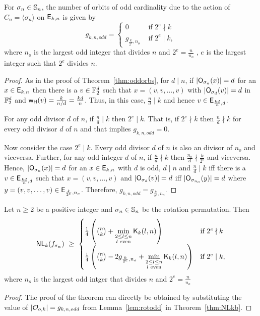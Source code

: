 \documentclass{llncs}
\begin{document}
\begin{lemma}\label{lem:rotodd}
For $\sigma_n \in \mathbb{S}_n$, the number of orbits of odd cardinality due to the action of $C_n = \langle\sigma_n\rangle$ on $\mathsf{E}_{k,n}$ is given by
$$g_{k,n,odd} = \begin{cases}
0 & \text{ if } 2^e \nmid k \\
g_{\frac{k}{2^e},n_o} & \text{ if } 2^e \mid k,
\end{cases}$$
where $n_o$ is the largest odd integer that divides $n$ and $2^e = \frac{n}{n_o}$ \ie, $e$ is the largest integer such that $2^e$ divides $n$.
\end{lemma}

\begin{proof}
As in the proof of Theorem~\ref{thm:oddorbs}, for $d \mid n$, if $|\mathsf{O}_{\sigma_n}(x)| = d$ for an $x \in \mathsf{E}_{k,n}$ then there is a $v \in \mathbb{F}_2^d$ such that $x = (v,v, \ldots, v)$ with $|\mathsf{O}_{\sigma_d}(v)| = d$ in $\mathbb{F}_2^d$ and $\mathsf{w_H}(v) = \frac{k}{n/d} = \frac{kd}{n}$. Thus, in this case, $\frac{n}{d} \mid k$ and hence $v \in \mathsf{E}_{\frac{kd}{n},d}$. 

For any odd divisor $d$ of $n$, if $\frac{n}{d} \mid k$ then $2^e \mid k$. That is, if $2^e \nmid k$ then $\frac{n}{d} \nmid k$ for every odd divisor $d$ of $n$ and that implies $g_{k,n,odd} = 0$.

Now consider the case $2^e \mid k$. Every odd divisor $d$ of $n$ is also an divisor of $n_o$ and viceversa. Further, for any odd integer $d$ of $n$, if $\frac{n}{d} \nmid k$ then $\frac{n_o}{d} \nmid \frac{k}{2^e}$ and viceversa.
Hence, $|\mathsf{O}_{\sigma_n}(x)| = d$ for an $x\in \mathsf{E}_{k,n}$ with $d$ is odd, $d\mid n$ and  $\frac{n}{d} \mid k$ iff there is a $v \in \mathsf{E}_{\frac{kd}{n},d}$ such that $x = (v,v, \ldots, v)$ and $|\mathsf{O}_{\sigma_d}(v)| = d$ iff $|\mathsf{O}_{\sigma_{n_o}}(y)| = d$ where $y = (v,v, \ldots, v) \in \mathsf{E}_{\frac{k}{2^e},n_o}$. Therefore, $g_{k,n,odd} = g_{\frac{k}{2^e},n_o}$.
\end{proof}

\begin{theorem}\label{thm:NLkb_sigma}
Let $n \geq 2$ be a positive integer and $\sigma_n \in \mathbb{S}_n$ be the rotation permutation.
Then $$\mathsf{NL}_{k}(f_{\sigma_n}) ~\geq ~
\begin{cases}
\frac{1}{4}\left({n \choose k} + \min\limits_{\substack{2 \leq l \leq n \\ l \text{ even}}} \mathsf{K}_{k}(l,n)\right) & \text{if } 2^e \nmid k \\
\frac{1}{4}\left({n \choose k} - 2g_{\frac{k}{2^e},n_o} + \min\limits_{\substack{2 \leq l \leq n \\ l \text{ even}}} \mathsf{K}_{k}(l,n)\right) & \text{if } 2^e \mid k,
\end{cases}$$
where $n_o$ is the largest odd intger that divides $n$ and $2^e = \frac{n}{n_o}$
\end{theorem}
\begin{proof} The proof of the theorem can directly be obtained by substituting the value of $|\mathcal{O}_{o,k}| = g_{k,n,odd}$ from Lemma~\ref{lem:rotodd} in Theorem~\ref{thm:NLkb}.
\end{proof}
\end{document}

